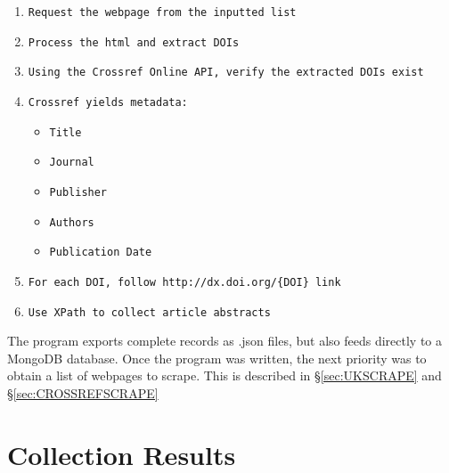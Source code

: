 \begin{sloppypar}
\begin{enumerate}
\item \texttt{Request the webpage from the inputted list}
\item \texttt{Process the html and extract DOIs}
\item \texttt{Using the Crossref Online API, verify the extracted DOIs exist}
\item \texttt{Crossref yields metadata:}
\begin{itemize}
\item \texttt{Title}
\item \texttt{Journal}
\item \texttt{Publisher}
\item \texttt{Authors}
\item \texttt{Publication Date}
\end{itemize}
\item \texttt{For each DOI,  follow \texttt{http://dx.doi.org/\{DOI\}} link}
\item \texttt{Use XPath to collect article abstracts}
\end{enumerate}
\end{sloppypar}
The program exports complete records as .json files, but also feeds directly to a MongoDB database. Once the program was written, the next priority was to obtain a list of webpages to scrape. This is described in  \S\ref{sec:UKSCRAPE} and \S\ref{sec:CROSSREFSCRAPE} 
\section{Collection Results}
